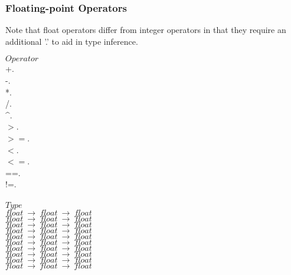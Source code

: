 \documentclass[5pt]{article}
\begin{document}
\subsubsection{Floating-point Operators}
Note that float operators differ from integer operators in that they require an additional '.' to aid in type inference.
\begin{multicols}{3}
\noindent $Operator$ \\
\hspace*{5mm} +. \\
\hspace*{5mm} -. \\
\hspace*{5mm} *. \\
\hspace*{5mm} /. \\
\hspace*{5mm} \^{}. \\
\hspace*{5mm} $>$. \\
\hspace*{5mm} $>=$. \\
\hspace*{5mm} $<$. \\
\hspace*{5mm} $<=$. \\
\hspace*{5mm} ==. \\
\hspace*{5mm} !=. \\
\columnbreak \\
\noindent $Type$ \\
$float \ \rightarrow \ float \ \rightarrow \ float $ \\
$float \ \rightarrow \ float \ \rightarrow \ float $ \\
$float \ \rightarrow \ float \ \rightarrow \ float $ \\
$float \ \rightarrow \ float \ \rightarrow \ float $ \\
$float \ \rightarrow \ float \ \rightarrow \ float $ \\
$float \ \rightarrow \ float \ \rightarrow \ float $ \\
$float \ \rightarrow \ float \ \rightarrow \ float $ \\
$float \ \rightarrow \ float \ \rightarrow \ float $ \\
$float \ \rightarrow \ float \ \rightarrow \ float $ \\
$float \ \rightarrow \ float \ \rightarrow \ float $ \\

\end{multicols}
\end{document}
